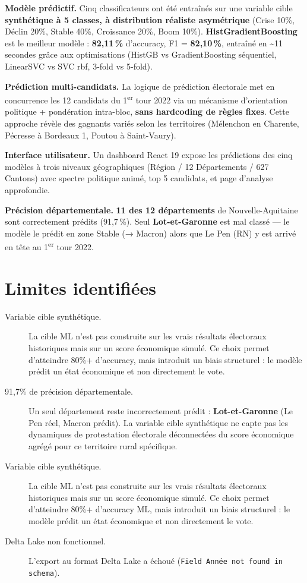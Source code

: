\documentclass[12pt,a4paper,oneside]{report}
\newcommand{\pct}[1]{#1\,\%}
\begin{document}
\textbf{Modèle prédictif.} Cinq classificateurs ont été entraînés sur une variable cible \textbf{synthétique à 5 classes, à distribution réaliste asymétrique} (Crise 10\%, Déclin 20\%, Stable 40\%, Croissance 20\%, Boom 10\%). \textbf{HistGradientBoosting} est le meilleur modèle : \textbf{\pct{82,11}} d'accuracy, F1 = \textbf{\pct{82,10}}, entraîné en \textasciitilde{}11 secondes grâce aux optimisations (HistGB vs GradientBoosting séquentiel, LinearSVC vs SVC rbf, 3-fold vs 5-fold).

\textbf{Prédiction multi-candidats.} La logique de prédiction électorale met en concurrence les 12 candidats du 1\textsuperscript{er} tour 2022 via un mécanisme d'orientation politique + pondération intra-bloc, \textbf{sans hardcoding de règles fixes}. Cette approche révèle des gagnants variés selon les territoires (Mélenchon en Charente, Pécresse à Bordeaux 1, Poutou à Saint-Vaury).

\textbf{Interface utilisateur.} Un dashboard React 19 expose les prédictions des cinq modèles à trois niveaux géographiques (Région / 12 Départements / 627 Cantons) avec spectre politique animé, top 5 candidats, et page d'analyse approfondie.

\textbf{Précision départementale.} \textbf{11 des 12 départements} de Nouvelle-Aquitaine sont correctement prédits (\pct{91,7}). Seul \textbf{Lot-et-Garonne} est mal classé — le modèle le prédit en zone Stable (→ Macron) alors que Le Pen (RN) y est arrivé en tête au 1\textsuperscript{er} tour 2022.

\section*{Limites identifiées}

\begin{description}
  \item[Variable cible synthétique.] La cible ML n'est pas construite sur les vrais résultats électoraux historiques mais sur un score économique simulé. Ce choix permet d'atteindre 80\%+ d'accuracy, mais introduit un biais structurel : le modèle prédit un état économique et non directement le vote.

  \item[91,7\% de précision départementale.] Un seul département reste incorrectement prédit : \textbf{Lot-et-Garonne} (Le Pen réel, Macron prédit). La variable cible synthétique ne capte pas les dynamiques de protestation électorale déconnectées du score économique agrégé pour ce territoire rural spécifique.

  \item[Variable cible synthétique.] La cible ML n'est pas construite sur les vrais résultats électoraux historiques mais sur un score économique simulé. Ce choix permet d'atteindre 80\%+ d'accuracy ML, mais introduit un biais structurel : le modèle prédit un état économique et non directement le vote.

  \item[Delta Lake non fonctionnel.] L'export au format Delta Lake a échoué (\texttt{Field Année not found in schema}).
\end{description}
\end{document}
